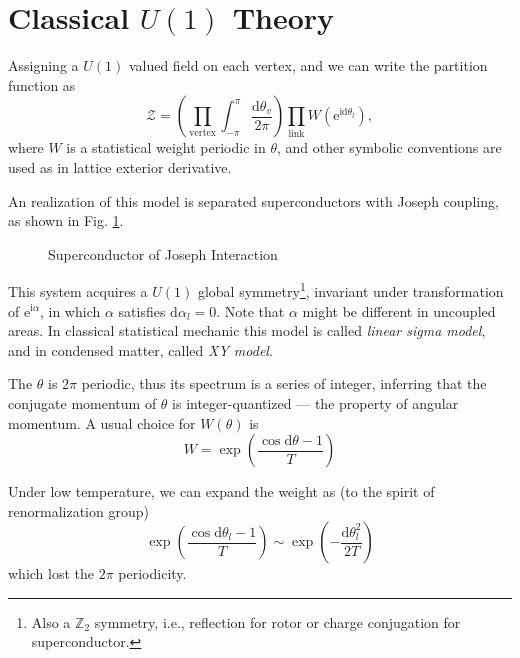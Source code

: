 
\section{Classical $U(1)$ Theory}

Assigning a $U(1)$ valued field on each vertex, and we can write the partition function as
\begin{equation}
  \mathcal{Z} = \left( \prod_{\text{vertex}} \int_{-\pi }^{\pi } \frac{\mathrm{d} \theta_{v}}{2\pi } \right) \prod_{\text{link}} W \left( \mathrm{e}^{\mathrm{i} \mathrm{d}  \theta_{l}} \right),
\end{equation}
where $W$ is a statistical weight periodic in $\theta$, and other symbolic conventions are used as in lattice exterior derivative.

An realization of this model is separated superconductors with Joseph coupling, as shown in Fig. \ref{fig:superconductor-of-joseph-interaction}.
\begin{figure}[ht]
    \centering
    \caption{Superconductor of Joseph Interaction}
    \label{fig:superconductor-of-joseph-interaction}
\end{figure}

This system acquires a $U(1)$ global symmetry\footnote{
  Also a $\mathbb{Z}_2$ symmetry, i.e., reflection for rotor or charge conjugation for superconductor.
}, invariant under transformation of $\mathrm{e}^{\mathrm{i}\alpha}$, in which $\alpha$ satisfies $\mathrm{d} \alpha _{l} = 0$. Note that $\alpha$ might be different in uncoupled areas.
In classical statistical mechanic this model is called \emph{linear sigma model}, and in condensed matter, called \emph{XY model}.

The $\theta$ is $2\pi $ periodic, thus its spectrum is a series of integer, inferring that the conjugate momentum of $\theta$ is integer-quantized --- the property of angular momentum.
A usual choice for $W(\theta)$ is 
\begin{equation}
  W = \exp \left( \frac{\cos \mathrm{d} \theta -1}{T} \right)
\end{equation}

Under low temperature, we can expand the weight as (to the spirit of renormalization group)
\begin{equation}
  \exp \left( \frac{\cos  \mathrm{d} \theta_{l} - 1}{T} \right) \sim \exp \left( - \frac{\mathrm{d} \theta_{l}^{2}}{2T} \right) 
\end{equation}
which lost the $2\pi $ periodicity.
